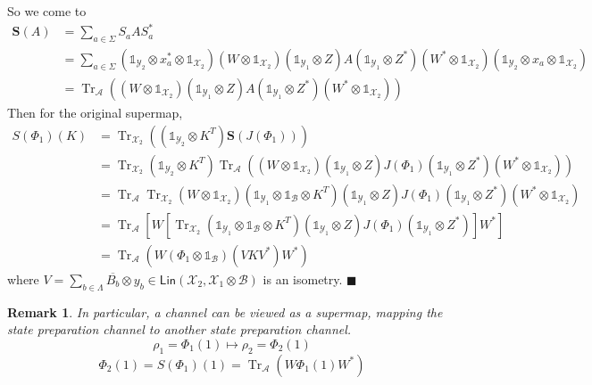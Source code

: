 \documentclass[aps,pra,onecolumn,notitlepage,superscriptaddress]{revtex4-1}
\newcommand{\spc}[1]{\mathcal{#1}}
\newcommand{\Lin}{\mathsf{Lin}}
\newcommand{\bs}[1]{\boldsymbol{#1}}
\newcommand{\Tr}{\operatorname{Tr}}
\newcommand\I{\mathds{1}}
\newtheorem{rem}{Remark}
\def\qed{$\blacksquare$ \newline}
\begin{document}
    So we come to
    \begin{align*}
        \bs{S}(A)
        &= \sum_{a \in \Sigma} S_a A S_a^* \\
        &= \sum_{a \in \Sigma} (\I_{\spc Y_2} \otimes x_a^* \otimes \I_{\spc X_2})  
        (W \otimes \I_{\spc X_2})
        (\I_{\spc Y_1} \otimes Z) 
        A   
        (\I_{\spc Y_1} \otimes Z^*)
        (W^* \otimes \I_{\spc X_2})
        (\I_{\spc Y_2} \otimes x_a \otimes \I_{\spc X_2}) \\
        &= \Tr_{\spc A} ((W \otimes \I_{\spc X_2}) ( \I_{\spc Y_1} \otimes Z ) A ( \I_{\spc Y_1} \otimes Z^* ) (W^* \otimes \I_{\spc X_2}))
    \end{align*}
    Then for the original supermap,
    \begin{align*}
        S(\Phi_1)(K)
        &= \Tr_{\spc X_2}((\I_{\spc Y_2} \otimes K^T) \bs{S}(J(\Phi_1))) \\
        &= \Tr_{\spc X_2}
        (\I_{\spc Y_2} \otimes K^T)
        \Tr_{\spc A} ((W \otimes \I_{\spc X_2}) ( \I_{\spc Y_1} \otimes Z ) J(\Phi_1) ( \I_{\spc Y_1} \otimes Z^* ) (W^* \otimes \I_{\spc X_2})) \\
        &= \Tr_{\spc A}\Tr_{\spc X_2}
        (W \otimes \I_{\spc X_2})
        (\I_{\spc Y_1} \otimes \I_{\spc B} \otimes K^T)
        ( \I_{\spc Y_1} \otimes Z ) J(\Phi_1) ( \I_{\spc Y_1} \otimes Z^* ) (W^* \otimes \I_{\spc X_2}) \\
        &= \Tr_{\spc A} [W [\Tr_{\spc X_2}
        (\I_{\spc Y_1} \otimes \I_{\spc B} \otimes K^T)
        ( \I_{\spc Y_1} \otimes Z ) J(\Phi_1) ( \I_{\spc Y_1} \otimes Z^* )] W^*] \\
        &= \Tr_{\spc A} (W (\Phi_1 \otimes \I_{\spc B})(VKV^*) W^*)
    \end{align*} 
    where $V = \sum_{b \in \Lambda} \overline{B_b} \otimes y_b \in \Lin(\spc X_2, \spc X_1 \otimes \spc B)$ is an isometry.
    \qed

    \begin{rem}
        In particular, a channel can be viewed as a supermap, mapping the state preparation channel to another state preparation channel. 
        \begin{equation}
            \rho_1 = \Phi_1(1) \mapsto \rho_2 = \Phi_2(1)
        \end{equation}
        \begin{equation}
            \Phi_2(1) = S(\Phi_1)(1) = \Tr_{\spc A}(W \Phi_1(1) W^*)
        \end{equation}
    \end{rem}

    
    
\end{document}
